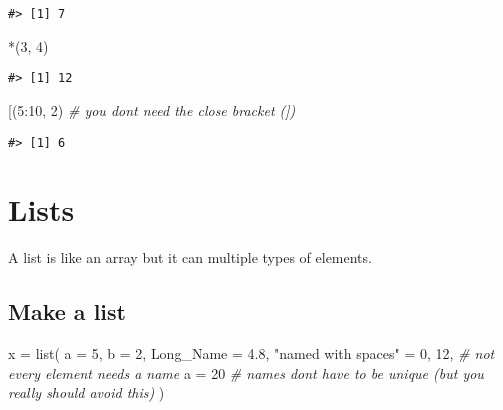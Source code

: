 \documentclass[
]{book}
\newenvironment{Shaded}{\begin{snugshade}}{\end{snugshade}}
\newcommand{\AttributeTok}[1]{\textcolor[rgb]{0.77,0.63,0.00}{#1}}
\newcommand{\CommentTok}[1]{\textcolor[rgb]{0.56,0.35,0.01}{\textit{#1}}}
\newcommand{\DecValTok}[1]{\textcolor[rgb]{0.00,0.00,0.81}{#1}}
\newcommand{\FloatTok}[1]{\textcolor[rgb]{0.00,0.00,0.81}{#1}}
\newcommand{\FunctionTok}[1]{\textcolor[rgb]{0.00,0.00,0.00}{#1}}
\newcommand{\NormalTok}[1]{#1}
\newcommand{\OtherTok}[1]{\textcolor[rgb]{0.56,0.35,0.01}{#1}}
\newcommand{\SpecialCharTok}[1]{\textcolor[rgb]{0.00,0.00,0.00}{#1}}
\newcommand{\StringTok}[1]{\textcolor[rgb]{0.31,0.60,0.02}{#1}}
\begin{document}
\begin{verbatim}
#> [1] 7
\end{verbatim}

\begin{Shaded}
\begin{Highlighting}[]
\StringTok{\textasciigrave{}}\AttributeTok{*}\StringTok{\textasciigrave{}}\NormalTok{(}\DecValTok{3}\NormalTok{, }\DecValTok{4}\NormalTok{)}
\end{Highlighting}
\end{Shaded}

\begin{verbatim}
#> [1] 12
\end{verbatim}

\begin{Shaded}
\begin{Highlighting}[]
\StringTok{\textasciigrave{}}\AttributeTok{[}\StringTok{\textasciigrave{}}\NormalTok{(}\DecValTok{5}\SpecialCharTok{:}\DecValTok{10}\NormalTok{, }\DecValTok{2}\NormalTok{) }\CommentTok{\# you don\textquotesingle{}t need the close bracket (])}
\end{Highlighting}
\end{Shaded}

\begin{verbatim}
#> [1] 6
\end{verbatim}

\hypertarget{lists}{%
\chapter{Lists}\label{lists}}

A list is like an array but it can multiple types of elements.

\hypertarget{make-a-list}{%
\section{Make a list}\label{make-a-list}}

\begin{Shaded}
\begin{Highlighting}[]
\NormalTok{x }\OtherTok{=} \FunctionTok{list}\NormalTok{(}
  \AttributeTok{a =} \DecValTok{5}\NormalTok{,}
  \AttributeTok{b =} \DecValTok{2}\NormalTok{,}
  \AttributeTok{Long\_Name =} \FloatTok{4.8}\NormalTok{,}
  \StringTok{"named with spaces"} \OtherTok{=} \DecValTok{0}\NormalTok{,}
  \DecValTok{12}\NormalTok{, }\CommentTok{\# not every element needs a name}
  \AttributeTok{a =} \DecValTok{20} \CommentTok{\# names don\textquotesingle{}t have to be unique (but you really should avoid this)}
\NormalTok{)}
\end{Highlighting}
\end{Shaded}
\end{document}
